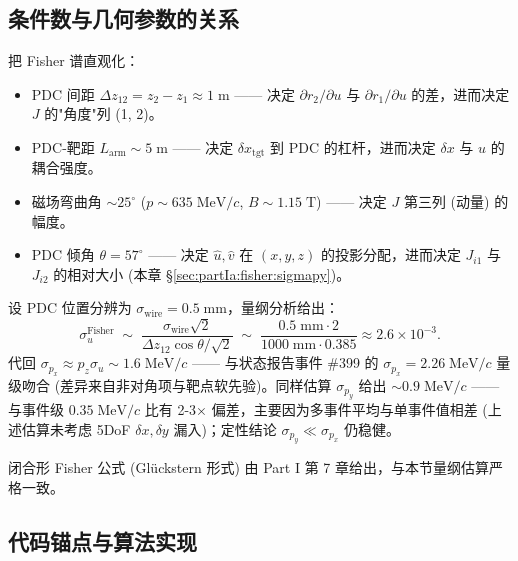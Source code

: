 \subsection{条件数与几何参数的关系}
\label{sec:partIa:fisher:cond_geom}

把 Fisher 谱直观化：
\begin{itemize}[nosep]
  \item PDC 间距 $\Delta z_{12}=z_2-z_1\approx 1\;\mathrm m$ —— 决定 $\partial r_2/\partial u$ 与 $\partial r_1/\partial u$ 的差，进而决定 $J$ 的"角度"列 (1, 2)。
  \item PDC-靶距 $L_\mathrm{arm}\sim 5\;\mathrm m$ —— 决定 $\delta x_\mathrm{tgt}$ 到 PDC 的杠杆，进而决定 $\delta x$ 与 $u$ 的耦合强度。
  \item 磁场弯曲角 $\sim 25^\circ$ ($p\sim 635\;\mathrm{MeV}/c$, $B\sim 1.15\;\mathrm T$) —— 决定 $J$ 第三列 (动量) 的幅度。
  \item PDC 倾角 $\theta=57^\circ$ —— 决定 $\hat u,\hat v$ 在 $(x,y,z)$ 的投影分配，进而决定 $J_{i1}$ 与 $J_{i2}$ 的相对大小 (本章 §\ref{sec:partIa:fisher:sigmapy})。
\end{itemize}

设 PDC 位置分辨为 $\sigma_\mathrm{wire}=0.5\;\mathrm{mm}$，量纲分析给出：
\begin{equation}
  \sigma_u^\mathrm{Fisher} \;\sim\;\frac{\sigma_\mathrm{wire}\sqrt 2}{\Delta z_{12}\cos\theta/\sqrt 2}\;\sim\;\frac{0.5\;\mathrm{mm}\cdot 2}{1000\;\mathrm{mm}\cdot 0.385}\approx 2.6\times 10^{-3}.
\end{equation}
代回 $\sigma_{p_x}\approx p_z\sigma_u\sim 1.6\;\mathrm{MeV}/c$ —— 与状态报告事件 \#399 的 $\sigma_{p_x}=2.26\;\mathrm{MeV}/c$ 量级吻合 (差异来自非对角项与靶点软先验)。同样估算 $\sigma_{p_y}$ 给出 $\sim 0.9\;\mathrm{MeV}/c$ —— 与事件级 $0.35\;\mathrm{MeV}/c$ 比有 2-3× 偏差，主要因为多事件平均与单事件值相差 (上述估算未考虑 5DoF $\delta x,\delta y$ 漏入)；定性结论 $\sigma_{p_y}\ll\sigma_{p_x}$ 仍稳健。

闭合形 Fisher 公式 (Glückstern 形式) 由 Part I 第 7 章给出，与本节量纲估算严格一致。

\subsection{代码锚点与算法实现}
\label{sec:partIa:fisher:code}


